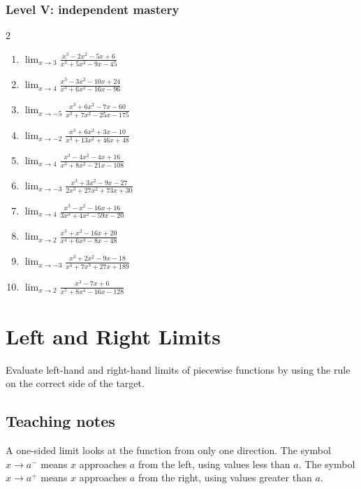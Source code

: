 \documentclass[11pt,oneside]{book}
\newenvironment{rulebox}[1]{\par\medskip\noindent{\color{navy}\bfseries #1}\par\noindent{\color{navy}\hrule}\smallskip}{\par\smallskip\noindent{\color{navy}\hrule}\par\medskip}
\begin{document}
\subsection*{Level V: independent mastery}
\begin{multicols}{2}
\begin{enumerate}[leftmargin=*,label=\textbf{\arabic*.},itemsep=0.65\baselineskip]
\item $\displaystyle \lim_{x \to 3} \frac{x^{3} - 2 x^{2} - 5 x + 6}{x^{3} + 5 x^{2} - 9 x - 45}$
\item $\displaystyle \lim_{x \to 4} \frac{x^{3} - 3 x^{2} - 10 x + 24}{x^{3} + 6 x^{2} - 16 x - 96}$
\item $\displaystyle \lim_{x \to -5} \frac{x^{3} + 6 x^{2} - 7 x - 60}{x^{3} + 7 x^{2} - 25 x - 175}$
\item $\displaystyle \lim_{x \to -2} \frac{x^{3} + 6 x^{2} + 3 x - 10}{x^{3} + 13 x^{2} + 46 x + 48}$
\item $\displaystyle \lim_{x \to 4} \frac{x^{3} - 4 x^{2} - 4 x + 16}{x^{3} + 8 x^{2} - 21 x - 108}$
\item $\displaystyle \lim_{x \to -3} \frac{x^{3} + 3 x^{2} - 9 x - 27}{2 x^{3} + 27 x^{2} + 73 x + 30}$
\item $\displaystyle \lim_{x \to 4} \frac{x^{3} - x^{2} - 16 x + 16}{3 x^{3} + 4 x^{2} - 59 x - 20}$
\item $\displaystyle \lim_{x \to 2} \frac{x^{3} + x^{2} - 16 x + 20}{x^{4} + 6 x^{3} - 8 x - 48}$
\item $\displaystyle \lim_{x \to -3} \frac{x^{3} + 2 x^{2} - 9 x - 18}{x^{4} + 7 x^{3} + 27 x + 189}$
\item $\displaystyle \lim_{x \to 2} \frac{x^{3} - 7 x + 6}{x^{5} + 8 x^{4} - 16 x - 128}$
\end{enumerate}
\end{multicols}

\chapter{Left and Right Limits}
\begin{rulebox}{Learning target}
Evaluate left-hand and right-hand limits of piecewise functions by using the rule on the correct side of the target.
\end{rulebox}
\section*{Teaching notes}
A one-sided limit looks at the function from only one direction. The symbol $x\to a^-$ means $x$ approaches $a$ from the left, using values less than $a$. The symbol $x\to a^+$ means $x$ approaches $a$ from the right, using values greater than $a$.
\end{document}
